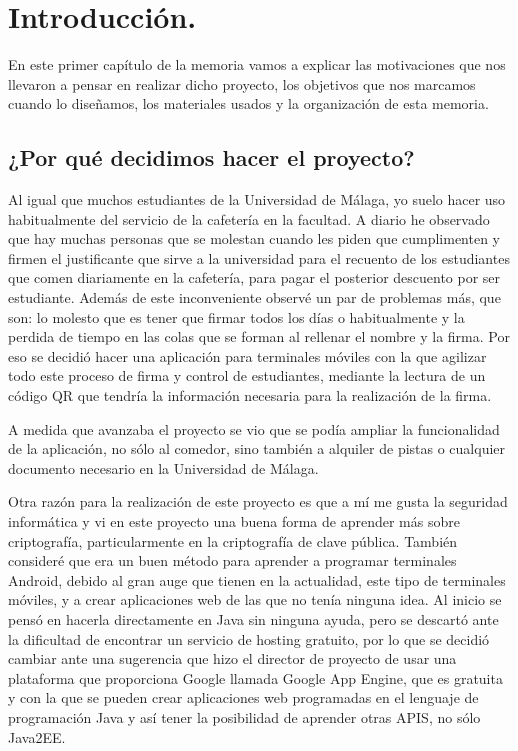 \chapter{Introducción.}
En este primer capítulo de la memoria vamos a explicar las motivaciones que nos llevaron a pensar en realizar dicho proyecto, los objetivos que nos marcamos cuando lo diseñamos, los materiales usados y la organización de esta memoria.

\section{¿Por qué decidimos hacer el proyecto?}
Al igual que muchos estudiantes de la Universidad de Málaga, yo suelo hacer uso habitualmente del servicio de la cafetería en la facultad. A diario he observado que hay muchas personas que se molestan cuando les piden que cumplimenten y firmen el justificante que sirve a la universidad para el recuento de los estudiantes que comen diariamente en la cafetería, para pagar el posterior descuento por ser estudiante. Además de este inconveniente observé un par de problemas más, que son: lo molesto que es tener que firmar todos los días o habitualmente y la perdida de tiempo en las colas que se forman al rellenar el nombre y la firma. Por eso se decidió hacer una aplicación para terminales móviles con la que agilizar todo este proceso de firma y control de estudiantes, mediante la lectura de un código QR que tendría la información necesaria para la realización de la firma.

A medida que avanzaba el proyecto se vio que se podía ampliar la funcionalidad de la aplicación, no sólo al comedor, sino también a alquiler de pistas o cualquier documento necesario en la Universidad de Málaga.

Otra razón para la realización de este proyecto es que a mí me gusta la seguridad informática y vi en este proyecto una buena forma de aprender más sobre criptografía, particularmente en la criptografía de clave pública. También consideré que era un buen método para aprender a programar terminales Android, debido al gran auge que tienen en la actualidad, este tipo de terminales móviles, y a crear aplicaciones web de las que no tenía ninguna idea. Al inicio se pensó en hacerla directamente en Java sin ninguna ayuda, pero se descartó ante la dificultad de encontrar un servicio de hosting gratuito, por lo que se decidió cambiar ante una sugerencia que hizo el director de proyecto de usar una plataforma que proporciona Google llamada Google App Engine, que es gratuita y con la que se pueden crear aplicaciones web programadas en el lenguaje de programación Java y así tener la posibilidad de aprender otras APIS, no sólo Java2EE.

